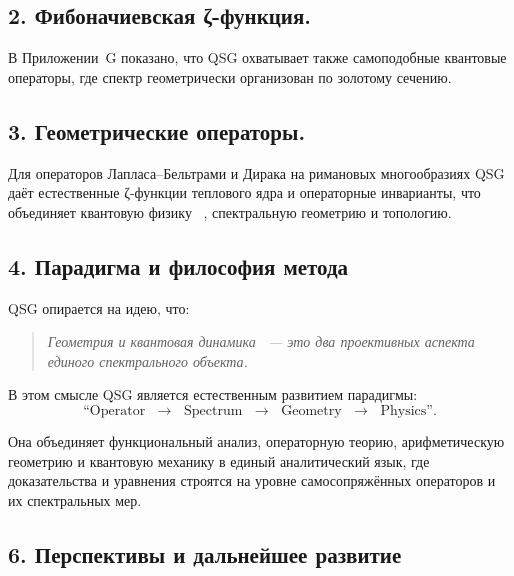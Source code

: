 \documentclass{article}
\numberwithin{equation}{section}
\theoremstyle{plain}
\theoremstyle{definition}
\theoremstyle{remark}
\begin{document}
\subsection*{2. Фибоначиевская ζ-функция.}
В Приложении~G показано, что QSG охватывает также самоподобные квантовые операторы,  
где спектр геометрически организован по золотому сечению.

\subsection*{3. Геометрические операторы.}
Для операторов Лапласа–Бельтрами и Дирака на римановых многообразиях  
QSG даёт естественные ζ-функции теплового ядра и операторные инварианты,  
что объединяет квантовую физику ~\cite{Gilkey1995, BerlineGetzlerVergne1992}, спектральную геометрию и топологию.

\subsection*{4. Парадигма и философия метода}

QSG опирается на идею, что:
\begin{quote}
\emph{Геометрия и квантовая динамика ~\cite{Monakhov-QSG-000}— это два проективных аспекта единого спектрального объекта.}
\end{quote}

В этом смысле QSG является естественным развитием парадигмы:
\begin{equation}
\text{``Operator $\;\to\;$ Spectrum $\;\to\;$ Geometry $\;\to\;$ Physics''}.
\label{eq:QSSC0060}
\end{equation}


Она объединяет функциональный анализ, операторную теорию, арифметическую геометрию и квантовую механику  
в единый аналитический язык, где доказательства и уравнения строятся на уровне самосопряжённых операторов и их спектральных мер.

\subsection*{6. Перспективы и дальнейшее развитие}
\end{document}
